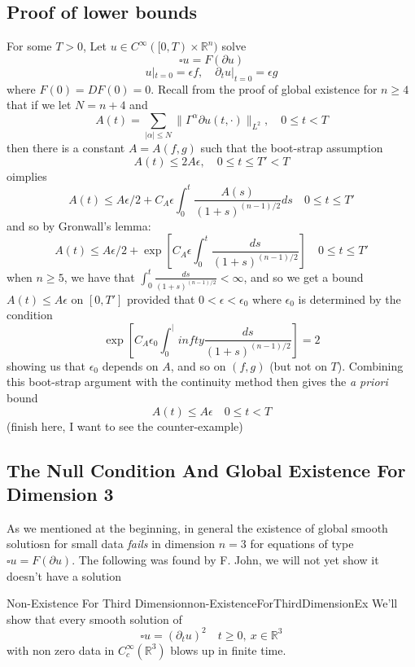 \documentclass{book}
\newcommand{\R}{{\mathbb{R}}}
\begin{document}
\subsection{Proof of lower bounds}

For some $T > 0$, Let $u \in C^\infty([0, T)\times \R^n)$ solve
\[
	\square u = F(  \partial u )
\]
\[
	u|_{t=0} = \epsilon f,\quad  \partial_t u|_{t=0} = \epsilon g
\]
where $F(0) = DF(0) = 0$. Recall from the proof of global existence for $n \ge 4$ that if we let $N = n+4$ and
\[
	A(t) = \sum_{|\alpha| \le N} \| \Gamma^\alpha  \partial u(t, \cdot)\|_{L^2},\quad 0 \le t < T
\]
then there is a constant $A = A(f,g)$ such that the boot-strap assumption
\[
	A(t) \le 2A\epsilon, \quad 0 \le t \le T' < T
\]
oimplies
\[
	A(t) \le A\epsilon/2 + C_A\epsilon \int_0^t \frac{A(s)}{(1+s)^{(n-1)/2}}ds \quad 0 \le t \le T'
\]
and so by Gronwall's lemma:
\[
	A(t) \le A\epsilon/2 + \exp\left[C_A\epsilon \int_0^t \frac{ds}{(1+s)^{(n-1)/2}}\right] \quad 0 \le t \le T'
\]
when $ n\ge 5$, we have that $\int_0^t \frac{ds}{(1+s)^{(n-1)/2}} < \infty$, and so we get a bound $A(t) \le
A\epsilon$ on $[0, T']$ provided that $0 < \epsilon < \epsilon_0$ where $\epsilon_0$ is determined by the
condition
\[
	\exp\left[ C_A \epsilon_0 \int_0^|infty \frac{ds}{(1+s)^{(n-1)/2}}\right] = 2
\]
showing us that $\epsilon_0$ depends on $A$, and so on $(f,g)$ (but not on $T$). Combining this boot-strap argument
with the continuity method then gives the \emph{a priori} bound
\[
	A(t) \le A\epsilon \quad 0 \le t < T
\]
(finish here, I want to see the counter-example)

\subsection{The Null Condition And Global Existence For Dimension 3}

As we mentioned at the beginning, in general the existence of global smooth solutiosn for small data \emph{fails} in
dimension $n =3$ for equations of type $\square u = F(  \partial u )$. The following was found by F. John, we will not
yet show it doesn't have a solution

\begin{example}{Non-Existence For Third Dimension}{non-ExistenceForThirdDimensionEx}
	We'll show that every smooth solution of
	\[
		\square u = (  \partial_t u )^2 \quad t \ge 0,\  x \in \R^3
	\]
	with non zero data in $C_c^\infty(\R^3)$ blows up in finite time.
\end{example}
\end{document}
